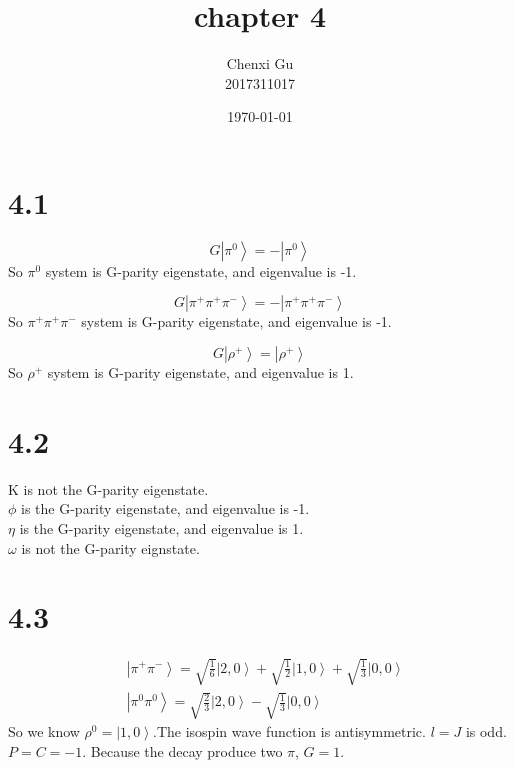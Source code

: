 \documentclass{article}
\begin{document}
\begin{CJK*}{GBK}{song}

\pagestyle{fancy}  
\fancyhead{} %
\renewcommand{\headrulewidth}{0.4pt}  
\renewcommand{\footrulewidth}{0.4pt} 



\title {chapter 4}
\author{Chenxi Gu\\2017311017}

\date{\today}

\maketitle

\section{4.1}
\begin{equation}
G\left|\pi^0\right\rangle=-\left|\pi^0\right\rangle
\end{equation}
So $\pi^0$ system is G-parity eigenstate, and eigenvalue is -1.

\begin{equation}
G\left|\pi^+\pi^+\pi^-\right\rangle=-\left|\pi^+\pi^+\pi^-\right\rangle
\end{equation}
So $\pi^+\pi^+\pi^-$ system is G-parity eigenstate, and eigenvalue is -1.

\begin{equation}
G\left|\rho^+\right\rangle=\left|\rho^+\right\rangle
\end{equation}
So $\rho^+$ system is G-parity eigenstate, and eigenvalue is 1.


\section{4.2}
K is not the G-parity eigenstate.\\
$\phi$ is the G-parity eigenstate, and eigenvalue is -1.\\
$\eta$ is the G-parity eigenstate, and eigenvalue is 1.\\
$\omega$ is not the G-parity eignstate.
\section{4.3}
\begin{equation}
\begin{aligned}
&\left|\pi^+\pi^-\right\rangle=\sqrt{\frac{1}{6}}\left|2,0\right\rangle+\sqrt{\frac{1}{2}}\left|1,0\right\rangle+\sqrt{\frac{1}{3}}\left|0,0\right\rangle\\
&\left|\pi^0\pi^0\right\rangle=\sqrt{\frac{2}{3}}\left|2,0\right\rangle-\sqrt{\frac{1}{3}}\left|0,0\right\rangle
\end{aligned}
\end{equation}
So we know $\rho^0=\left|1,0\right\rangle$.The isospin wave function is antisymmetric. $l=J$ is odd.$P=C=-1$.
Because the decay produce two $\pi$, $G=1$.


\end{CJK*}
\end{document}
